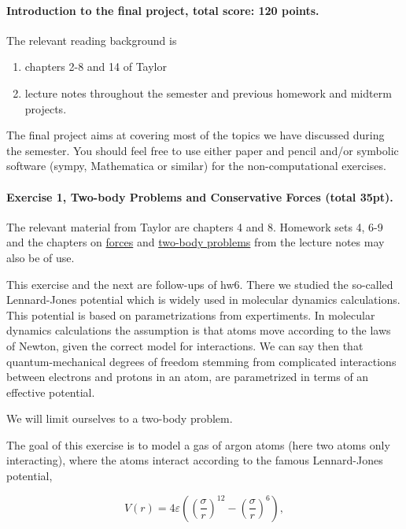 \documentclass[%
oneside,                 %
final,                   %
10pt]{article}
\begin{document}
\noindent
\paragraph{Introduction to the final project, total score: 120  points.}
The relevant reading background is
\begin{enumerate}
\item chapters 2-8 and 14 of Taylor

\item lecture notes throughout the semester and previous homework and midterm projects.
\end{enumerate}

\noindent
The final project aims at covering most of the topics we have
discussed during the semester. You should feel free to use either
paper and pencil and/or symbolic software (sympy, Mathematica or
similar) for the non-computational exercises.


\paragraph{Exercise 1, Two-body Problems and Conservative Forces (total 35pt).}
The relevant material from Taylor are chapters 4 and 8. Homework sets 4, 6-9 and the chapters on \href{{https://mhjensen.github.io/Physics321/doc/LectureNotes/_build/html/chapter4.html}}{forces} and \href{{https://mhjensen.github.io/Physics321/doc/LectureNotes/_build/html/chapter6.html}}{two-body problems} from the lecture notes may also be of use. 

This exercise and the next are  follow-ups of hw6. There we studied the so-called
Lennard-Jones potential which is widely used in molecular dynamics
calculations. This potential is based on parametrizations from
expertiments. In molecular dynamics calculations the assumption is
that atoms move according to the laws of Newton, given the correct
model for interactions. We can say then that quantum-mechanical
degrees of freedom stemming from complicated interactions between electrons
and protons in an atom, are parametrized in terms of an effective
potential.

We will limit ourselves to a two-body problem.

The goal of this exercise is to model a gas of argon atoms (here two
atoms only interacting), where the atoms interact according to the
famous Lennard-Jones potential,

\begin{equation}
    V(r) = 4\varepsilon\left((\frac{\sigma}{r})^{12} - (\frac{\sigma}{r})^6\right), \label{eq:lj}
\end{equation}
\end{document}
